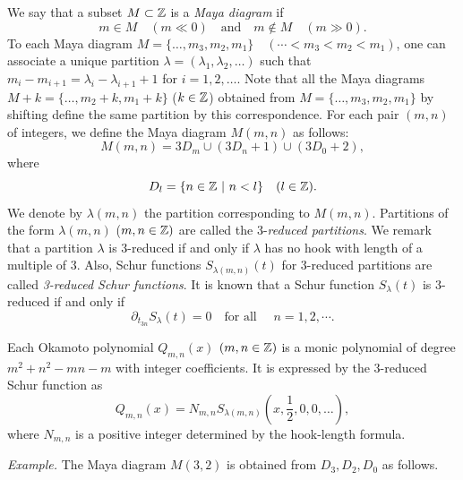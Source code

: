We say that a subset $M\subset{\Bbb Z}$ is a {\em Maya diagram} if 
\begin{equation}
m \in M \quad (m \ll 0)
\quad\mbox{and}\quad
m \not\in M \quad (m \gg 0).
\end{equation}
To each Maya diagram 
$M=\{\ldots, m_3,m_2,m_1\} \quad
(\cdots < m_3 < m_2 < m_1)$, 
one can associate a unique partition $\lambda=(\lambda_1,\lambda_2,\ldots)$ 
such that $m_i-m_{i+1}=\lambda_i-\lambda_{i+1}+1$ for $i=1,2,\ldots$. 
Note that all the Maya diagrams  
$M+k=\{\ldots,m_2+k,m_1+k\}$ ($k\in{\Bbb Z}$)
obtained from $M=\{\ldots, m_3,m_2,m_1\}$ by shifting 
define the same partition by this correspondence. 
For each pair $(m,n)$ of integers, we define the Maya diagram 
$M(m,n)$ as follows: 
\begin{equation}
M(m,n)=3 D_m \cup(3 D_n+1) \cup (3 D_0+2), 
\end{equation}
where
\begin{equation}
D_l=\{ n\in {\Bbb Z} \ | \ n<l \}\quad(l\in{\Bbb Z}). 
\end{equation}
We denote by  $\lambda(m,n)$ 
the partition corresponding to $M(m,n)$. 
Partitions of the form $\lambda(m,n)$ ($m,n\in{\Bbb Z})$ are 
called the 3-{\em reduced partitions}. 
We remark that a partition $\lambda$ is 3-reduced if and only 
if $\lambda$ has no hook with length of a multiple of $3$.  
Also, Schur functions $S_{\lambda(m,n)}(t)$ for 3-reduced partitions 
are called {\em 3-reduced Schur functions}.  
It is known that a Schur function $S_{\lambda}(t)$ is 3-reduced 
if and only if 
\begin{equation}
\partial_{t_{3n}} S_{\lambda}(t)=0 \quad \mbox{for all }\quad n=1,2,\cdots.
\end{equation}
\par\medskip
\begin{thm} \label{ThmOka}
Each Okamoto polynomial $Q_{m,n}(x)$ $(m,n\in{\Bbb Z})$ is a monic 
polynomial of degree $m^2+n^2-mn-m$ with integer coefficients.   
It is expressed by the 3-reduced Schur function as 
\begin{equation}
Q_{m,n}(x)=N_{m,n} S_{\lambda(m,n)}(x,\frac{1}{2},0,0,\ldots), 
\end{equation}
where $N_{m,n}$ is a positive integer determined by the hook-length formula. 
\end{thm}
\par\noindent
{\em Example.}\quad 
The Maya diagram $M(3,2)$ is obtained from $D_3,D_2,D_0$ as follows.
\par\medskip\smallskip\noindent

